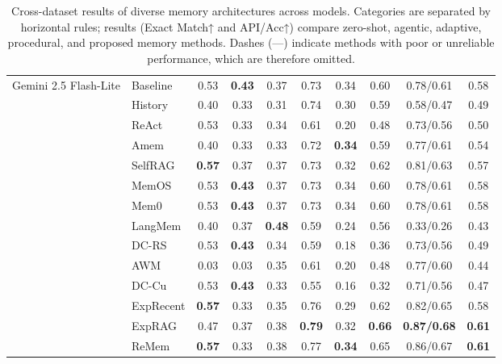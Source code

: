 \begin{table}[t!]
{\begin{tabular}{l l*{8}{c}}
\multirow{15}{*}{Gemini 2.5 Flash-Lite}
 & Baseline          & 0.53 & \textbf{0.43} & 0.37 & 0.73 & 0.34 & 0.60 & 0.78/0.61 & 0.58 \\
 & History     & 0.40 & 0.33 & 0.31 & 0.74 & 0.30 & 0.59 & 0.58/0.47 & 0.49 \\
\cmidrule(lr){2-10}
 & ReAct                   & 0.53 & 0.33 & 0.34 & 0.61 & 0.20 & 0.48 & 0.73/0.56 & 0.50 \\
 & Amem                    & 0.40 & 0.33 & 0.33 & 0.72 & \textbf{0.34} & 0.59 & 0.77/0.61 & 0.54 \\
\cmidrule(lr){2-10}
 & SelfRAG                 & \textbf{0.57} & 0.37 & 0.37 & 0.73 & 0.32 & 0.62 & 0.81/0.63 & 0.57 \\
 & MemOS                   & 0.53 & \textbf{0.43} & 0.37 & 0.73 & 0.34 & 0.60 & 0.78/0.61 & 0.58 \\
 & Mem0                    & 0.53 & \textbf{0.43} & 0.37 & 0.73 & 0.34 & 0.60 & 0.78/0.61 & 0.58 \\
 & LangMem                 & 0.40 & 0.37 & \textbf{0.48} & 0.59 & 0.24 & 0.56 & 0.33/0.26 & 0.43 \\
\cmidrule(lr){2-10}
 & DC-RS                   & 0.53 & \textbf{0.43} & 0.34 & 0.59 & 0.18 & 0.36 & 0.73/0.56 & 0.49 \\
 & AWM                     & 0.03 & 0.03 & 0.35 & 0.61 & 0.20 & 0.48 & 0.77/0.60 & 0.44 \\
 & DC-Cu                   & 0.53 & \textbf{0.43} & 0.33 & 0.55 & 0.16 & 0.32 & 0.71/0.56 & 0.47 \\
\cmidrule(lr){2-10}
 & ExpRecent               & \textbf{0.57} & 0.33 & 0.35 & 0.76 & 0.29 & 0.62 & 0.82/0.65 & 0.58 \\
 & ExpRAG                  & 0.47 & 0.37 & 0.38 & \textbf{0.79} & 0.32 & \textbf{0.66} & \textbf{0.87/0.68} & \textbf{0.61} \\
 & ReMem                   & \textbf{0.57} & 0.33 & 0.38 & 0.77 & \textbf{0.34} & 0.65 & 0.86/0.67 & \textbf{0.61} \\
\bottomrule
\end{tabular}}
\caption{Cross-dataset results of diverse memory architectures across models. 
Categories are separated by horizontal rules; results (Exact Match↑ and API/Acc↑) compare zero-shot, agentic, adaptive, procedural, and proposed memory methods. 
Dashes (—) indicate methods with poor or unreliable performance, which are therefore omitted.}
\label{tab:single_full}
\end{table}